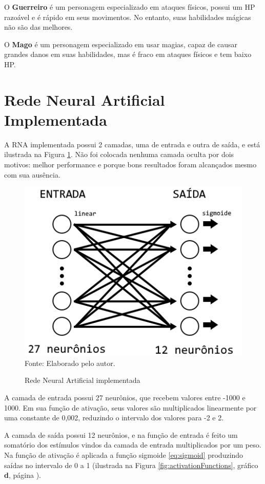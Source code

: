 \documentclass[
	12pt,					%
	openright,				%
	oneside,				%
	a4paper,				%
	bibjustif,				%
	chapter=TITLE,			%
	english,				%
	brazil,					%
	]{abntex2}
\newcommand{\source}[1]{\small Fonte: {#1}}
\begin{document}
	O \textbf{Guerreiro} é um personagem especializado em ataques físicos,
	possui um HP razoável e é rápido em seus movimentos.
	No entanto, suas habilidades mágicas não são das melhores.
	
	O \textbf{Mago} é um personagem especializado em usar magias,
	capaz de causar grandes danos em suas habilidades,
	mas é fraco em ataques físicos e tem baixo HP.
	
	\FloatBarrier
	\section{Rede Neural Artificial Implementada}
	A RNA implementada possui 2 camadas,
	uma de entrada e outra de saída,
	e está ilustrada na Figura \ref{fig:gameNN}.
	Não foi colocada nenhuma camada oculta por dois motivos:
	melhor performance e
	porque bons resultados foram alcançados mesmo com sua ausência.
	
	\begin{figure}[ht!]
		\centering
		\caption{Rede Neural Artificial implementada}
		\includegraphics[scale=0.9]{img/GameNN.png}\\
		\vspace{0.5mm}
		\source{Elaborado pelo autor.}
		\label{fig:gameNN}
	\end{figure}
	
	A camada de entrada possui 27 neurônios,
	que recebem valores entre -1000 e 1000.
	Em sua função de ativação,
	seus valores são multiplicados linearmente por uma constante de 0,002,
	reduzindo o intervalo dos valores para -2 e 2.
	
	A camada de saída possui 12 neurônios,
	e na função de entrada é feito um somatório dos estímulos vindos da camada de entrada multiplicados por um peso.
	Na função de ativação é aplicada a função sigmoide \eqref{eq:sigmoid}
	produzindo saídas no intervalo de 0 a 1
	(ilustrada na Figura \ref{fig:activationFunctions},
	gráfico \textbf{d},
	página \pageref{fig:activationFunctions}).
	
\end{document}
